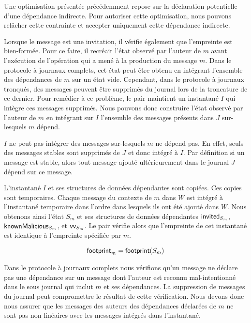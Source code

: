 \begin{remark}
Une optimisation présentée précédemment repose sur la déclaration potentielle d'une dépendance indirecte.
Pour autoriser cette optimisation, nous pouvons relâcher cette contrainte et accepter uniquement cette dépendance indirecte.
\end{remark}

Lorsque le message est une invitation, il vérifie également que l'empreinte est bien-formée.
Pour ce faire, il recréait l'état observé par l'auteur de $m$ avant l'exécution de l'opération qui a mené à la production du message $m$.
Dans le protocole à journaux complets, cet état peut être obtenu en intégrant l'ensemble des dépendances de $m$ sur un état vide.
Cependant, dans le protocole à journaux tronqués, des messages peuvent être supprimés du journal lors de la troncature de ce dernier.
Pour remédier à ce problème, le pair maintient un instantané $I$ qui intègre ces messages supprimés.
Nous pouvons donc construire l'état observé par l'auteur de $m$ en intégrant sur $I$ l'ensemble des messages présents dans $J$ sur-lesquels $m$ dépend.

\begin{remark}
$I$ ne peut pas intégrer des messages sur-lesquels $m$ ne dépend pas.
En effet, seuls des messages stables sont supprimés de $J$ et donc intégré à $I$.
Par définition si un message est stable, alors tout message ajouté ultérieurement dans le journal $J$ dépend sur ce message.
\end{remark}

L'instantané $I$ et ses structures de données dépendantes sont copiées.
Ces copies sont temporaires.
Chaque message du contexte de $m$ dans $W$ est intégré à l'instantané temporaire dans l'ordre dans lesquels ils ont été ajouté dans $W$.
Nous obtenons ainsi l'état $S_m$ et ses structures de données dépendantes $\operatorname{\mathsf{invited}}_{S_m}$, $\operatorname{\mathsf{knownMalicious}}_{S_m}$, et $\operatorname{\mathsf{vv}}_{S_m}$.
Le pair vérifie alors que l'empreinte de cet instantané est identique à l'empreinte spécifiée par $m$.

\begin{equation*}
    \operatorname{\mathsf{footprint}}_m = \operatorname{\mathsf{footprint}}(S_m)
\end{equation*}

Dans le protocole à journaux complets nous vérifions qu'un message ne déclare pas une dépendance sur un message dont l'auteur est reconnu mal-intentionné dans le sous journal qui inclut $m$ et ses dépendances.
La suppression de messages du journal peut compromettre le résultat de cette vérification.
Nous devons donc nous assurer que les messages des auteurs des dépendances déclarées de $m$ ne sont pas non-linéaires avec les messages intégrés dans l'instantané.

